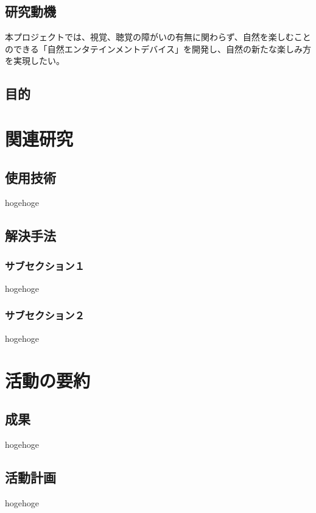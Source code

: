 \documentclass[12pt,a4paper]{report}
\begin{document}
\section{研究動機}
\noindent\space
本プロジェクトでは、視覚、聴覚の障がいの有無に関わらず、自然を楽しむことのできる「自然エンタテインメントデバイス」を開発し、自然の新たな楽しみ方を実現したい。
\section{目的}
\noindent


\chapter{関連研究}
\section{使用技術}
\noindent
hogehoge
\section{解決手法}
\subsection{サブセクション１}
\noindent
hogehoge
\subsection{サブセクション２}
\noindent
hogehoge

\chapter{活動の要約}
\section{成果}
\noindent
hogehoge
\section{活動計画}
\noindent
hogehoge
\end{document}
